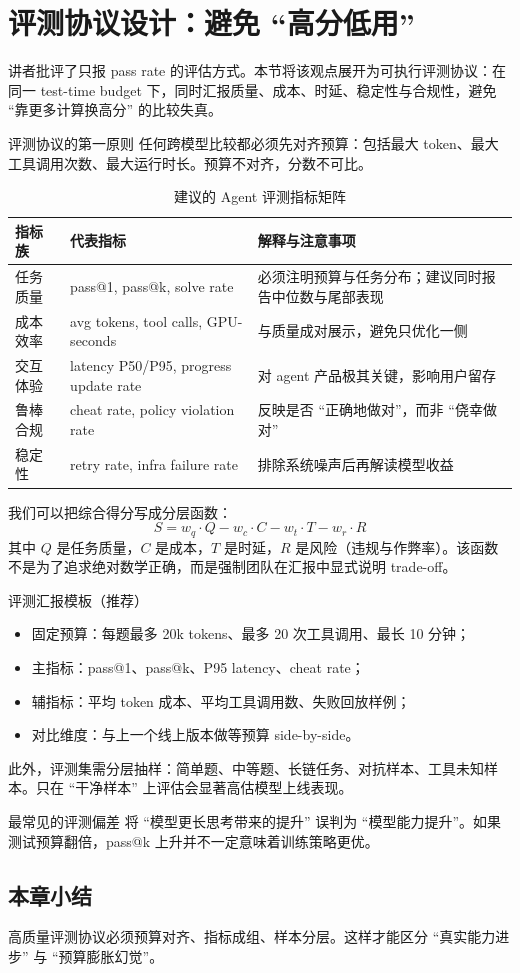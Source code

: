 \section{评测协议设计：避免 ``高分低用''}

讲者批评了只报 pass rate 的评估方式。本节将该观点展开为可执行评测协议：在同一 test-time budget 下，同时汇报质量、成本、时延、稳定性与合规性，避免 ``靠更多计算换高分'' 的比较失真。

\begin{importantbox}{评测协议的第一原则}
任何跨模型比较都必须先对齐预算：包括最大 token、最大工具调用次数、最大运行时长。预算不对齐，分数不可比。
\end{importantbox}

\begin{table}[H]
\centering
\begin{tabular}{p{2.3cm}p{3.0cm}p{5.0cm}}
\toprule
\textbf{指标族} & \textbf{代表指标} & \textbf{解释与注意事项} \\
\midrule
任务质量 & pass@1, pass@k, solve rate & 必须注明预算与任务分布；建议同时报告中位数与尾部表现 \\
成本效率 & avg tokens, tool calls, GPU-seconds & 与质量成对展示，避免只优化一侧 \\
交互体验 & latency P50/P95, progress update rate & 对 agent 产品极其关键，影响用户留存 \\
鲁棒合规 & cheat rate, policy violation rate & 反映是否 ``正确地做对''，而非 ``侥幸做对'' \\
稳定性 & retry rate, infra failure rate & 排除系统噪声后再解读模型收益 \\
\bottomrule
\end{tabular}
\caption{建议的 Agent 评测指标矩阵}
\end{table}

我们可以把综合得分写成分层函数：
\[
S = w_q \cdot Q - w_c \cdot C - w_t \cdot T - w_r \cdot R
\]
其中 \(Q\) 是任务质量，\(C\) 是成本，\(T\) 是时延，\(R\) 是风险（违规与作弊率）。该函数不是为了追求绝对数学正确，而是强制团队在汇报中显式说明 trade-off。

\begin{knowledgebox}{评测汇报模板（推荐）}
\begin{itemize}
    \item 固定预算：每题最多 20k tokens、最多 20 次工具调用、最长 10 分钟；
    \item 主指标：pass@1、pass@k、P95 latency、cheat rate；
    \item 辅指标：平均 token 成本、平均工具调用数、失败回放样例；
    \item 对比维度：与上一个线上版本做等预算 side-by-side。
\end{itemize}
\end{knowledgebox}

此外，评测集需分层抽样：简单题、中等题、长链任务、对抗样本、工具未知样本。只在 ``干净样本'' 上评估会显著高估模型上线表现。

\begin{warningbox}{最常见的评测偏差}
将 ``模型更长思考带来的提升'' 误判为 ``模型能力提升''。如果测试预算翻倍，pass@k 上升并不一定意味着训练策略更优。
\end{warningbox}

\subsection{本章小结}
高质量评测协议必须预算对齐、指标成组、样本分层。这样才能区分 ``真实能力进步'' 与 ``预算膨胀幻觉''。

